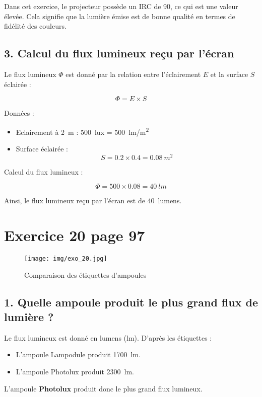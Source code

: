 \documentclass[a4paper,11pt]{article}
\begin{document}
Dans cet exercice, le projecteur possède un IRC de 90, ce qui est une valeur élevée. Cela signifie que la lumière émise est de bonne qualité en termes de fidélité des couleurs.

\subsection*{3. Calcul du flux lumineux reçu par l'écran}

Le flux lumineux \( \Phi \) est donné par la relation entre l'éclairement \( E \) et la surface \( S \) éclairée :

\begin{equation}
    \Phi = E \times S
\end{equation}

Données :
\begin{itemize}
    \item Eclairement à \SI{2}{m} : \SI{500}{lux} = \SI{500}{lm/m^2}
    \item Surface éclairée :
    \begin{equation}
        S = 0.2 \times 0.4 = \SI{0.08}{m^2}
    \end{equation}
\end{itemize}

Calcul du flux lumineux :

\begin{equation}
    \Phi = 500 \times 0.08 = \SI{40}{lm}
\end{equation}

Ainsi, le flux lumineux reçu par l'écran est de \SI{40}{lumens}.


\section*{Exercice 20 page 97}

\begin{figure}[H]
    \centering
    \texttt{[image: img/exo\_20.jpg]}
    \caption{Comparaison des étiquettes d'ampoules}
    \label{fig:etiquettes_ampoules}
\end{figure}

\subsection*{1. Quelle ampoule produit le plus grand flux de lumière ?}
Le flux lumineux est donné en lumens (lm). D'après les étiquettes :
\begin{itemize}
    \item L'ampoule Lampodule produit \SI{1700}{lm}.
    \item L'ampoule Photolux produit \SI{2300}{lm}.
\end{itemize}
L'ampoule \textbf{Photolux} produit donc le plus grand flux lumineux.
\end{document}
